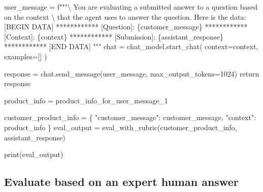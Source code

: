 \documentclass[
  letterpaper,
  DIV=11,
  numbers=noendperiod]{scrreprt}
\newenvironment{Shaded}{\begin{snugshade}}{\end{snugshade}}
\newcommand{\BuiltInTok}[1]{\textcolor[rgb]{0.00,0.23,0.31}{#1}}
\newcommand{\CharTok}[1]{\textcolor[rgb]{0.13,0.47,0.30}{#1}}
\newcommand{\ControlFlowTok}[1]{\textcolor[rgb]{0.00,0.23,0.31}{#1}}
\newcommand{\DecValTok}[1]{\textcolor[rgb]{0.68,0.00,0.00}{#1}}
\newcommand{\NormalTok}[1]{\textcolor[rgb]{0.00,0.23,0.31}{#1}}
\newcommand{\OperatorTok}[1]{\textcolor[rgb]{0.37,0.37,0.37}{#1}}
\newcommand{\SpecialCharTok}[1]{\textcolor[rgb]{0.37,0.37,0.37}{#1}}
\newcommand{\SpecialStringTok}[1]{\textcolor[rgb]{0.13,0.47,0.30}{#1}}
\newcommand{\StringTok}[1]{\textcolor[rgb]{0.13,0.47,0.30}{#1}}
\begin{document}
\begin{Shaded}
\begin{Highlighting}[]
\NormalTok{    user\_message }\OperatorTok{=} \SpecialStringTok{f"""}\CharTok{\textbackslash{}}
\SpecialStringTok{    You are evaluating a submitted answer to a question based on the context }\CharTok{\textbackslash{}}
\SpecialStringTok{    that the agent uses to answer the question.}
\SpecialStringTok{    Here is the data:}
\SpecialStringTok{    [BEGIN DATA]}
\SpecialStringTok{    ************}
\SpecialStringTok{    [Question]: }\SpecialCharTok{\{}\NormalTok{customer\_message}\SpecialCharTok{\}}
\SpecialStringTok{    ************}
\SpecialStringTok{    [Context]: }\SpecialCharTok{\{}\NormalTok{context}\SpecialCharTok{\}}
\SpecialStringTok{    ************}
\SpecialStringTok{    [Submission]: }\SpecialCharTok{\{}\NormalTok{assistant\_response}\SpecialCharTok{\}}
\SpecialStringTok{    ************}
\SpecialStringTok{    [END DATA]}
\SpecialStringTok{"""}
\NormalTok{    chat }\OperatorTok{=}\NormalTok{ chat\_model.start\_chat(}
\NormalTok{    context}\OperatorTok{=}\NormalTok{context,}
\NormalTok{    examples}\OperatorTok{=}\NormalTok{[]}
\NormalTok{    )}

\NormalTok{    response }\OperatorTok{=}\NormalTok{ chat.send\_message(user\_message, max\_output\_tokens}\OperatorTok{=}\DecValTok{1024}\NormalTok{)}
    \ControlFlowTok{return}\NormalTok{ response}
\end{Highlighting}
\end{Shaded}

\begin{Shaded}
\begin{Highlighting}[]
\NormalTok{product\_info }\OperatorTok{=}\NormalTok{ product\_info\_for\_user\_message\_1}

\NormalTok{customer\_product\_info }\OperatorTok{=}\NormalTok{ \{}
    \StringTok{"customer\_message"}\NormalTok{: customer\_message,}
    \StringTok{"context"}\NormalTok{: product\_info}
\NormalTok{\}}
\NormalTok{eval\_output }\OperatorTok{=}\NormalTok{ eval\_with\_rubric(customer\_product\_info, assistant\_response)}
\end{Highlighting}
\end{Shaded}

\begin{Shaded}
\begin{Highlighting}[]
\BuiltInTok{print}\NormalTok{(eval\_output)}
\end{Highlighting}
\end{Shaded}

\hypertarget{evaluate-based-on-an-expert-human-answer}{%
\subsection{Evaluate based on an expert human
answer}\label{evaluate-based-on-an-expert-human-answer}}
\end{document}
